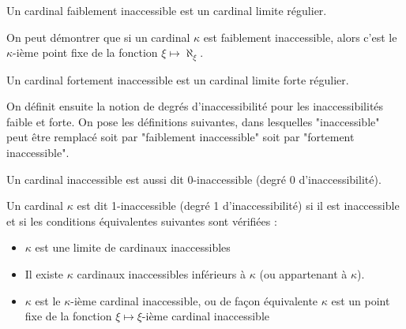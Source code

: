 \documentclass[12pt]{beamer}
\begin{document}
\begin{frame}

Un cardinal faiblement inaccessible est un cardinal limite régulier.

On peut démontrer que si un cardinal \( \kappa \) est faiblement inaccessible, alors c'est le \( \kappa \)-ième point fixe de la fonction \( \xi \mapsto \aleph_\xi \).

Un cardinal fortement inaccessible est un cardinal limite forte régulier.

On définit ensuite la notion de degrés d'inaccessibilité pour les inaccessibilités faible et forte.
On pose les définitions suivantes, dans lesquelles "inaccessible" peut être remplacé soit par "faiblement inaccessible" soit par "fortement inaccessible".

\end{frame}
\begin{frame}

Un cardinal inaccessible est aussi dit 0-inaccessible (degré 0 d'inaccessibilité).

Un cardinal \( \kappa \) est dit 1-inaccessible (degré 1 d'inaccessibilité) si il est inaccessible et si les conditions équivalentes suivantes sont vérifiées : 

\begin{itemize}
     \setlength{\itemsep}{1pt}
     \setlength{\parskip}{0pt}
     \setlength{\parsep}{0pt}
\item \(\kappa\) est une limite de cardinaux inaccessibles
\item Il existe \(\kappa\) cardinaux inaccessibles inférieurs à \( \kappa \) (ou appartenant à \( \kappa \)).
\item \(\kappa\) est le \(\kappa\)-ième cardinal inaccessible, ou de façon équivalente \(\kappa\) est un point fixe de la fonction \( \xi \mapsto \xi\)-ième cardinal inaccessible 
\end{itemize}

\end{frame}
\end{document}
